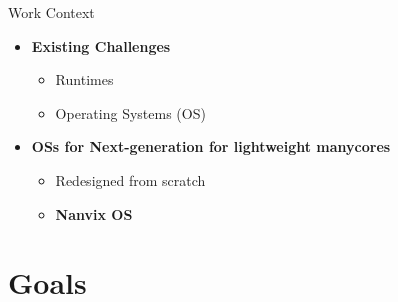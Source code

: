 	\begin{frame}[fragile]{Work Context}
		\begin{itemize}
			\item \textbf{Existing Challenges} %
			\begin{itemize}
				\item Runtimes
				\item Operating Systems (OS)
			\end{itemize}
		\end{itemize}

		\begin{itemize}
			\item \textbf{OSs for Next-generation for lightweight manycores}
			\begin{itemize}
				\item Redesigned from scratch
				\item \textbf{Nanvix OS}
			\end{itemize}
		\end{itemize}

	\end{frame}

\section{Goals}

